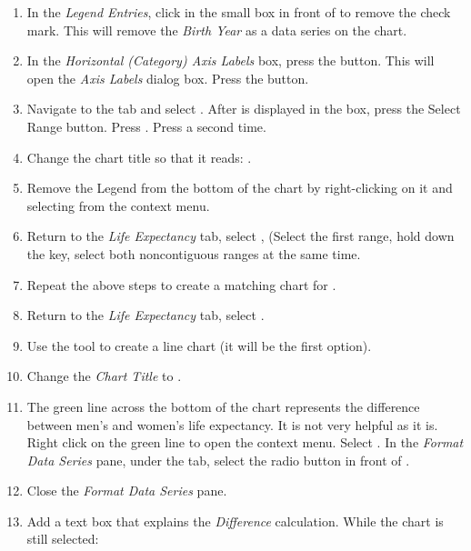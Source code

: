 \begin{enumerate}[resume]
	\item In the \textit{Legend Entries}, click in the small box in front of  to remove the check mark. This will remove the \textit{Birth Year} as a data series on the chart.
	\item In the \textit{Horizontal (Category) Axis Labels} box, press the  button. This will open the \textit{Axis Labels} dialog box. Press the  button.
	\item Navigate to the  tab and select . After  is displayed in the box, press the Select Range button. Press . Press  a second time.
	\item Change the chart title so that it reads: .
	\item Remove the Legend from the bottom of the chart by right-clicking on it and selecting  from the context menu.
	\item Return to the \textit{Life Expectancy} tab, select ,  (Select the first range, hold down the  key, select both noncontiguous ranges at the same time.
	\item Repeat the above steps to create a matching chart for .
	\item Return to the \textit{Life Expectancy} tab, select .
	\item Use the  tool to create a line chart (it will be the first option).
	\item Change the \textit{Chart Title} to .
	\item The green line across the bottom of the chart represents the difference between men's and women's life expectancy. It is not very helpful as it is. Right click on the green line to open the context menu. Select . In the \textit{Format Data Series} pane, under the  tab, select the radio button in front of .
	\item Close the \textit{Format Data Series} pane.
	\item Add a text box that explains the \textit{Difference} calculation. While the chart is still selected:
	

\end{enumerate}
